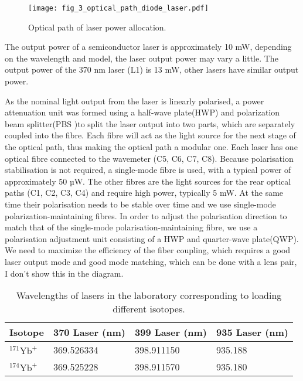 \begin{figure}
    \centering
    \texttt{[image: fig\_3\_optical\_path\_diode\_laser.pdf]}
    \caption{Optical path of laser power allocation.}
    \label{fig:fig_3_optical_path_diode_laser}
\end{figure}

The output power of a semiconductor laser is approximately 10 mW, depending on the wavelength and model, the laser output power may vary a little. The output power of the 370 nm laser (L1) is 13 mW,
other lasers have similar output power.

As the nominal light output from the laser is linearly polarised, a power attenuation unit was formed using a half-wave plate(HWP) and polarization beam splitter(PBS )to split the laser output into two parts, which are separately coupled into the fibre. Each fibre will act as the light source for the next stage of the optical path, thus making the optical path a modular one. Each laser has one optical fibre connected to the wavemeter (C5, C6, C7, C8). Because polarisation stabilisation is not required, a single-mode fibre is used, with a typical power of approximately 50 µW. The other fibres are the light sources for the rear optical paths (C1, C2, C3, C4) and require high power, typically 5 mW. At the same time their polarisation needs to be stable over time and we use single-mode polarization-maintaining fibres. In order to adjust the polarisation direction to match that of the single-mode polarisation-maintaining fibre, we use a polarisation adjustment unit consisting of a HWP and quarter-wave plate(QWP). We need to maximize the efficiency of the fiber coupling, which requires a good laser output mode and good mode matching, which can be done with a lens pair, I don't show this in the diagram.

\begin{table}
    \centering
    \caption{Wavelengths of lasers in the laboratory corresponding to loading different isotopes.}
    \begin{tabular}{llll}
        \toprule
        Isotope                     & 370 Laser (nm) & 399 Laser (nm) & 935 Laser (nm) \\
        \midrule
        ${ }^{171} \mathrm{Yb}^{+}$ & 369.526334     & 398.911150     & 935.188        \\
        ${ }^{174} \mathrm{Yb}^{+}$ & 369.525228     & 398.911570     & 935.180        \\
        \bottomrule
    \end{tabular}
\end{table}

